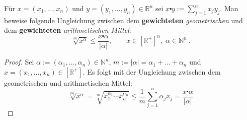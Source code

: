 \begin{aufgabe}
	Für $x = (x_1, \ldots, x_n)$ und $y = (y_1, \ldots, y_n) \in \mathbb R^n$ sei 
	$x \centerdot y := \sum_{j=1}^n x_j y_j$. Man beweise folgende Ungleichung
	zwischen dem \textbf{gewichteten} \textit{geometrischen} und dem \textbf{gewichteten}
	\textit{arithmetischen Mittel}:
	\[
		\sqrt[|\alpha|]{x^\alpha} \leq \frac{x \centerdot \alpha}{|\alpha|}, 
		\qquad x \in \left[ \mathbb R^+ \right]^n, \; \alpha \in \mathbb N^n \ .
	\]
\end{aufgabe}
\begin{proof}
Sei $\alpha := ( \alpha_1, \dots, \alpha_n) \in \mathbb N^n$, 
$m := | \alpha | = \alpha_1 + \dots + \alpha_n$
und $x = (x_1, \dots, x_n) \in \left[ \mathbb R^+ \right]$. Es folgt
mit der Ungleichung zwischen dem geometrischen und arithmetischen Mittel:
\[
	\sqrt[|\alpha|]{x^\alpha}
	= \sqrt[m]{x_1^{\alpha_1} \cdots x_n^{\alpha_n}}
	\leq \frac 1 m \sum_{j=1}^n \alpha_j x_j
	= \frac{x \centerdot \alpha}{|\alpha|}
\]
\end{proof}

